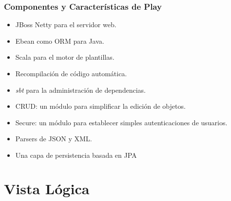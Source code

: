 \subsubsection{Componentes y Características de Play}
\begin{itemize}
  \item JBoss Netty para el servidor web.
  \item Ebean como ORM para Java.
  \item Scala para el motor de plantillas.
  \item Recompilación de código automática.
  \item \emph{sbt} para la administración de dependencias.
  \item CRUD: un módulo para simplificar la edición de objetos.
  \item Secure: un módulo para establecer simples autenticaciones de usuarios.
  \item Parsers de JSON y XML.
  \item Una capa de persistencia basada en JPA
\end{itemize}
\clearpage
\section{Vista Lógica}
\clearpage
